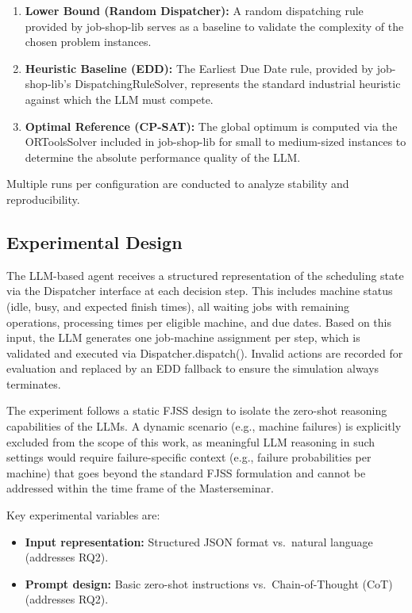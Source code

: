 \documentclass{article}
\begin{document}
\begin{enumerate}
  \item \textbf{Lower Bound (Random Dispatcher):} A random dispatching rule
    provided by job-shop-lib serves as a baseline to validate the
    complexity of the chosen problem instances.
  \item \textbf{Heuristic Baseline (EDD):} The Earliest Due Date rule,
    provided by job-shop-lib's DispatchingRuleSolver,
    represents the standard industrial heuristic against which the LLM must
    compete.
  \item \textbf{Optimal Reference (CP-SAT):} The global optimum is computed
    via the ORToolsSolver included in job-shop-lib for small
    to medium-sized instances to determine the absolute performance quality of
    the LLM.
\end{enumerate}
 
Multiple runs per configuration are conducted to analyze stability and
reproducibility.


\subsection{Experimental Design}

The LLM-based agent receives a structured representation of the scheduling
state via the Dispatcher interface at each decision step. This
includes machine status (idle, busy, and expected finish times), all waiting
jobs with remaining operations, processing times per eligible machine, and due
dates. Based on this input, the LLM generates one job-machine assignment per
step, which is validated and executed via Dispatcher.dispatch().
Invalid actions are recorded for evaluation and replaced by an EDD fallback
to ensure the simulation always terminates.
 
The experiment follows a static FJSS design to isolate the zero-shot reasoning
capabilities of the LLMs. A dynamic scenario (e.g., machine failures) is
explicitly excluded from the scope of this work, as meaningful LLM reasoning
in such settings would require failure-specific context (e.g., failure
probabilities per machine) that goes beyond the standard FJSS formulation and
cannot be addressed within the time frame of the Masterseminar.
 
Key experimental variables are:
 
\begin{itemize}
  \item \textbf{Input representation:} Structured JSON format vs.\ natural
    language (addresses RQ2).
  \item \textbf{Prompt design:} Basic zero-shot instructions
    vs.\ Chain-of-Thought (CoT) (addresses RQ2).
\end{itemize}
\end{document}
